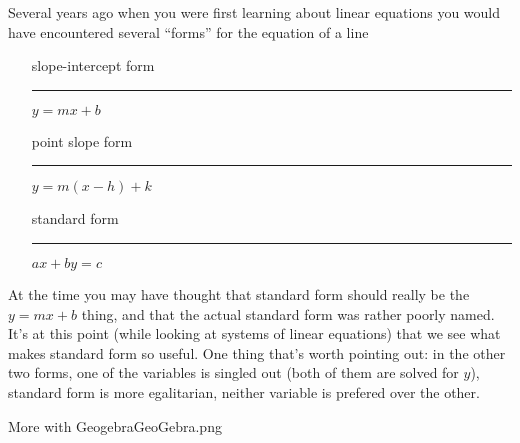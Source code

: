Several years ago when you were first learning about linear equations you would have encountered several ``forms'' for the equation of a line

\begin{itemize}
	\item[slope-intercept form] \rule{0pt}{24pt} \rule{12pt}{0pt} $y = mx + b$
	\item[point slope form] \rule{0pt}{24pt} \rule{12pt}{0pt} $y = m(x - h) + k$
	\item[standard form] \rule{0pt}{24pt} \rule{12pt}{0pt} $ax + by = c$
\end{itemize}

At the time you may have thought that standard form should really be the $y=mx+b$ thing, and that the actual standard form was rather poorly named.  It's at this point (while looking at systems of linear equations) that we see what makes standard form so useful.  One thing that's worth pointing out: in the other two forms, one of the variables is singled out (both of them are solved for $y$), standard form is more egalitarian, neither variable is prefered over the other.

\clearpage
 \begin{worksheet}{17}{More with Geogebra}{GeoGebra.png}
 
 \end{worksheet}
\clearpage
